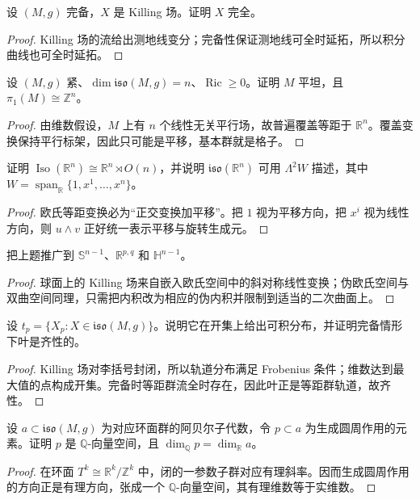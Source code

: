 \documentclass[11pt,a4paper,openany]{ctexbook}
\numberwithin{equation}{chapter}
\begin{document}
\begin{exercise}
设 \((M,g)\) 完备，\(X\) 是 Killing 场。证明 \(X\) 完全。
\end{exercise}
\begin{proof}
Killing 场的流给出测地线变分；完备性保证测地线可全时延拓，所以积分曲线也可全时延拓。
\end{proof}

\begin{exercise}
设 \((M,g)\) 紧、\(\dim\mathfrak{iso}(M,g)=n\)、\(\operatorname{Ric}\ge 0\)。证明 \(M\) 平坦，且 \(\pi_1(M)\cong\mathbb Z^n\)。
\end{exercise}
\begin{proof}
由维数假设，\(M\) 上有 \(n\) 个线性无关平行场，故普遍覆盖等距于 \(\mathbb R^n\)。覆盖变换保持平行标架，因此只可能是平移，基本群就是格子。
\end{proof}

\begin{exercise}
证明 \(\operatorname{Iso}(\mathbb R^n)\cong \mathbb R^n\rtimes O(n)\)，并说明 \(\mathfrak{iso}(\mathbb R^n)\) 可用 \(\Lambda^2W\) 描述，其中 \(W=\operatorname{span}_{\mathbb R}\{1,x^1,\dots,x^n\}\)。
\end{exercise}
\begin{proof}
欧氏等距变换必为“正交变换加平移”。把 \(1\) 视为平移方向，把 \(x^i\) 视为线性方向，则 \(u\wedge v\) 正好统一表示平移与旋转生成元。
\end{proof}

\begin{exercise}
把上题推广到 \(\mathbb S^{n-1}\)、\(\mathbb R^{p,q}\) 和 \(\mathbb H^{n-1}\)。
\end{exercise}
\begin{proof}
球面上的 Killing 场来自嵌入欧氏空间中的斜对称线性变换；伪欧氏空间与双曲空间同理，只需把内积改为相应的伪内积并限制到适当的二次曲面上。
\end{proof}

\begin{exercise}
设 \(t_p=\{X_p:X\in\mathfrak{iso}(M,g)\}\)。说明它在开集上给出可积分布，并证明完备情形下叶是齐性的。
\end{exercise}
\begin{proof}
Killing 场对李括号封闭，所以轨道分布满足 Frobenius 条件；维数达到最大值的点构成开集。完备时等距群流全时存在，因此叶正是等距群轨道，故齐性。
\end{proof}

\begin{exercise}
设 \(a\subset\mathfrak{iso}(M,g)\) 为对应环面群的阿贝尔子代数，令 \(p\subset a\) 为生成圆周作用的元素。证明 \(p\) 是 \(\mathbb Q\)-向量空间，且 \(\dim_{\mathbb Q}p=\dim_{\mathbb R}a\)。
\end{exercise}
\begin{proof}
在环面 \(T^k\cong \mathbb R^k/\mathbb Z^k\) 中，闭的一参数子群对应有理斜率。因而生成圆周作用的方向正是有理方向，张成一个 \(\mathbb Q\)-向量空间，其有理维数等于实维数。
\end{proof}
\end{document}
